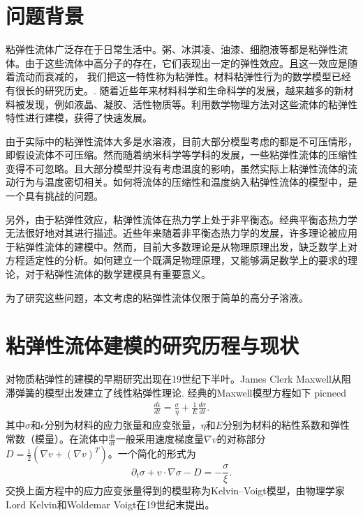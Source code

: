 \documentclass{article}
\begin{document}
\section{问题背景}
粘弹性流体广泛存在于日常生活中。粥、冰淇凌、油漆、细胞液等都是粘弹性流体。由于这些流体中高分子的存在，它们表现出一定的弹性效应。且这一效应是随着流动而衰减的\cite{}， 我们把这一特性称为粘弹性。材料粘弹性行为的数学模型已经有很长的研究历史。\cite{}. 随着近些年来材料科学和生命科学的发展，越来越多的新材料被发现，例如液晶、凝胶、活性物质等\cite{}。利用数学物理方法对这些流体的粘弹性特性进行建模，获得了快速发展\cite{}。

由于实际中的粘弹性流体大多是水溶液，目前大部分模型考虑的都是不可压情形，即假设流体不可压缩。然而随着纳米科学等学科的发展，一些粘弹性流体的压缩性变得不可忽略\cite{}。且大部分模型并没有考虑温度的影响，虽然实际上粘弹性流体的流动行为与温度密切相关。如何将流体的压缩性和温度纳入粘弹性流体的模型中，是一个具有挑战的问题\cite{}。

另外，由于粘弹性效应，粘弹性流体在热力学上处于非平衡态。经典平衡态热力学无法很好地对其进行描述。近些年来随着非平衡态热力学的发展，许多理论被应用于粘弹性流体的建模中\cite{}。然而，目前大多数理论是从物理原理出发，缺乏数学上对方程适定性的分析。如何建立一个既满足物理原理，又能够满足数学上的要求的理论，对于粘弹性流体的数学建模具有重要意义\cite{}。

为了研究这些问题，本文考虑的粘弹性流体仅限于简单的高分子溶液。

\section{粘弹性流体建模的研究历程与现状}
对物质粘弹性的建模的早期研究出现在19世纪下半叶。James Clerk Maxwell从阻滞弹簧的模型出发建立了线性粘弹性理论\cite{}. 经典的Maxwell模型方程如下
picneed
\begin{eqnarray*}
\frac {d\epsilon} {dt} = \frac {\sigma} {\eta} + \frac {1} {E} \frac {d\sigma} {dt}.
\end{eqnarray*}
其中$\sigma$和$\epsilon$分别为材料的应力张量和应变张量，$\eta$和$E$分别为材料的粘性系数和弹性常数（模量）。在流体中$\frac {d\epsilon} {dt}$一般采用速度梯度量$\nabla v$的对称部分$D=\frac{1}{2} (\nabla v + (\nabla v)^T)$。一个简化的形式为
\begin{equation} \label{eq:maxwell}
			\partial_t \sigma + v \cdot \nabla \sigma - D = -\frac{\sigma}{\xi}. 
\end{equation}
交换上面方程中的应力应变张量得到的模型称为Kelvin–Voigt模型，由物理学家Lord Kelvin和Woldemar Voigt在19世纪末提出\cite{}。
\end{document}
